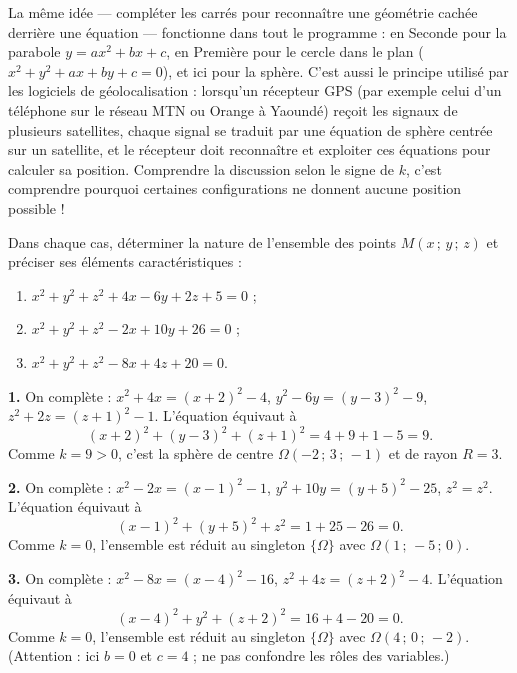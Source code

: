 \documentclass[11pt]{article}
\begin{document}
\begin{savaistu}
La même idée — compléter les carrés pour reconnaître une géométrie cachée derrière une équation — fonctionne dans tout le programme : en Seconde pour la parabole $y=ax^2+bx+c$, en Première pour le cercle dans le plan ($x^2+y^2+ax+by+c=0$), et ici pour la sphère. C'est aussi le principe utilisé par les logiciels de géolocalisation : lorsqu'un récepteur GPS (par exemple celui d'un téléphone sur le réseau MTN ou Orange à Yaoundé) reçoit les signaux de plusieurs satellites, chaque signal se traduit par une équation de sphère centrée sur un satellite, et le récepteur doit reconnaître et exploiter ces équations pour calculer sa position. Comprendre la discussion selon le signe de $k$, c'est comprendre pourquoi certaines configurations ne donnent aucune position possible !
\end{savaistu}

\begin{exercice}
Dans chaque cas, déterminer la nature de l'ensemble des points $M(x\,;\,y\,;\,z)$ et préciser ses éléments caractéristiques :
\begin{enumerate}
\item $x^2+y^2+z^2+4x-6y+2z+5=0$ ;
\item $x^2+y^2+z^2-2x+10y+26=0$ ;
\item $x^2+y^2+z^2-8x+4z+20=0$.
\end{enumerate}
\end{exercice}

\begin{corrige}
\textbf{1.} On complète : $x^2+4x=(x+2)^2-4$, $y^2-6y=(y-3)^2-9$, $z^2+2z=(z+1)^2-1$. L'équation équivaut à
\[
(x+2)^2+(y-3)^2+(z+1)^2 = 4+9+1-5 = 9.
\]
Comme $k=9>0$, c'est la sphère de centre $\Omega(-2\,;\,3\,;\,-1)$ et de rayon $R=3$.

\textbf{2.} On complète : $x^2-2x=(x-1)^2-1$, $y^2+10y=(y+5)^2-25$, $z^2=z^2$. L'équation équivaut à
\[
(x-1)^2+(y+5)^2+z^2 = 1+25-26 = 0.
\]
Comme $k=0$, l'ensemble est réduit au singleton $\{\Omega\}$ avec $\Omega(1\,;\,-5\,;\,0)$.

\textbf{3.} On complète : $x^2-8x=(x-4)^2-16$, $z^2+4z=(z+2)^2-4$. L'équation équivaut à
\[
(x-4)^2+y^2+(z+2)^2 = 16+4-20 = 0.
\]
Comme $k=0$, l'ensemble est réduit au singleton $\{\Omega\}$ avec $\Omega(4\,;\,0\,;\,-2)$. (Attention : ici $b=0$ et $c=4$ ; ne pas confondre les rôles des variables.)
\end{corrige}
\end{document}
